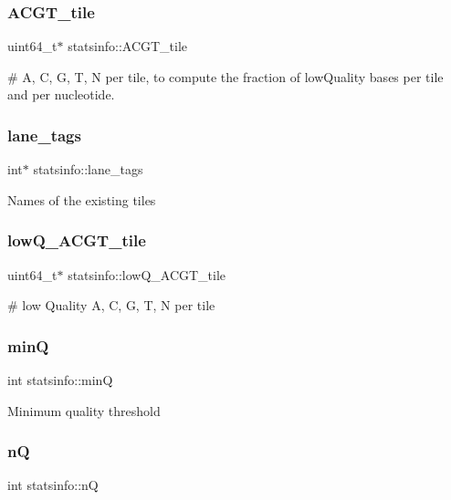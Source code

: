 \subsubsection{\texorpdfstring{A\+C\+G\+T\+\_\+tile}{ACGT\_tile}}
{\footnotesize\ttfamily uint64\+\_\+t$\ast$ statsinfo\+::\+A\+C\+G\+T\+\_\+tile}

\# A, C, G, T, N per tile, to compute the fraction of low\+Quality bases per tile and per nucleotide. \mbox{\label{structstatsinfo_a2fc74c1d7cec79d9b28b5e578d96d7a1}} 
\subsubsection{\texorpdfstring{lane\+\_\+tags}{lane\_tags}}
{\footnotesize\ttfamily int$\ast$ statsinfo\+::lane\+\_\+tags}

Names of the existing tiles \mbox{\label{structstatsinfo_ac1a8b88e2e4f486f2767072588adcd2a}} 
\subsubsection{\texorpdfstring{low\+Q\+\_\+\+A\+C\+G\+T\+\_\+tile}{lowQ\_ACGT\_tile}}
{\footnotesize\ttfamily uint64\+\_\+t$\ast$ statsinfo\+::low\+Q\+\_\+\+A\+C\+G\+T\+\_\+tile}

\# low Quality A, C, G, T, N per tile \mbox{\label{structstatsinfo_a6b33794a27827b8e2ea2b45a95f937d9}} 
\subsubsection{\texorpdfstring{minQ}{minQ}}
{\footnotesize\ttfamily int statsinfo\+::minQ}

Minimum quality threshold \mbox{\label{structstatsinfo_a8f99f5ac1c3643e6ad59f124c11676e2}} 
\subsubsection{\texorpdfstring{nQ}{nQ}}
{\footnotesize\ttfamily int statsinfo\+::nQ}

